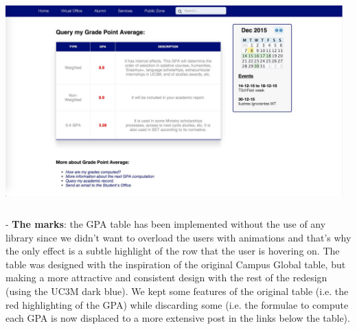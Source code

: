 \documentclass{article}
\begin{document}
\begin{center} 
\includegraphics[width=13cm, height=8cm, keepaspectratio]{imp_notamedia}
\end{center} 

- \textbf{The marks}: the GPA table has been implemented without the use of any library since we didn't want to overload the users with animations and that's why the only effect is a subtle
highlight of the row that the user is hovering on. The table was designed with the
inspiration of the original Campus Global table, but making a more attractive and
consistent design with the rest of the redesign (using the UC3M dark blue). We
kept some features of the original table (i.e. the red highlighting of the GPA)
while discarding some (i.e. the formulae to compute each GPA is now displaced to
a more extensive post in the links below the table).
\end{document}
